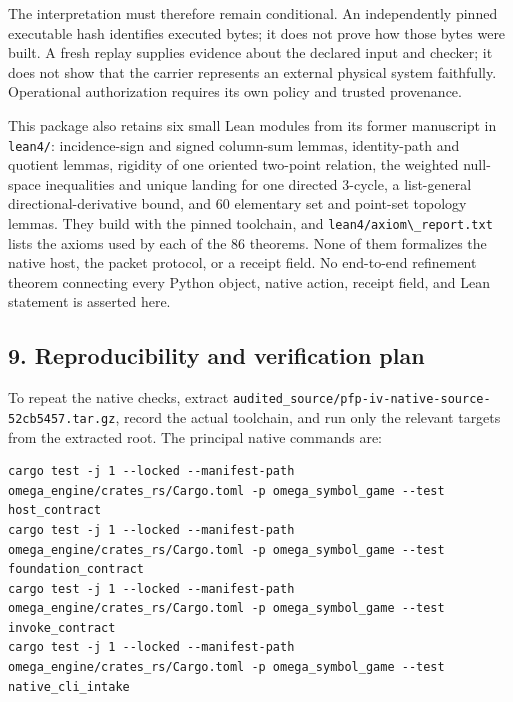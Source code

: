 \documentclass[
  11pt,
]{article}
\newcommand{\passthrough}[1]{#1}
\begin{document}
The interpretation must therefore remain conditional. An independently
pinned executable hash identifies executed bytes; it does not prove how
those bytes were built. A fresh replay supplies evidence about the
declared input and checker; it does not show that the carrier represents
an external physical system faithfully. Operational authorization
requires its own policy and trusted provenance.

This package also retains six small Lean modules from its former
manuscript in \passthrough{\lstinline!lean4/!}: incidence-sign and
signed column-sum lemmas, identity-path and quotient lemmas, rigidity of
one oriented two-point relation, the weighted null-space inequalities
and unique landing for one directed 3-cycle, a list-general
directional-derivative bound, and 60 elementary set and point-set
topology lemmas. They build with the pinned toolchain, and
\passthrough{\lstinline!lean4/axiom\_report.txt!} lists the axioms used
by each of the 86 theorems. None of them formalizes the native host, the
packet protocol, or a receipt field. No end-to-end refinement theorem
connecting every Python object, native action, receipt field, and Lean
statement is asserted here.

\subsection{9. Reproducibility and verification
plan}\label{reproducibility-and-verification-plan}

To repeat the native checks, extract
\nolinkurl{audited_source/pfp-iv-native-source-52cb5457.tar.gz}, record the
actual toolchain, and run only the relevant targets from the extracted
root. The principal native commands are:

\begin{lstlisting}
cargo test -j 1 --locked --manifest-path omega_engine/crates_rs/Cargo.toml -p omega_symbol_game --test host_contract
cargo test -j 1 --locked --manifest-path omega_engine/crates_rs/Cargo.toml -p omega_symbol_game --test foundation_contract
cargo test -j 1 --locked --manifest-path omega_engine/crates_rs/Cargo.toml -p omega_symbol_game --test invoke_contract
cargo test -j 1 --locked --manifest-path omega_engine/crates_rs/Cargo.toml -p omega_symbol_game --test native_cli_intake
\end{lstlisting}
\end{document}
